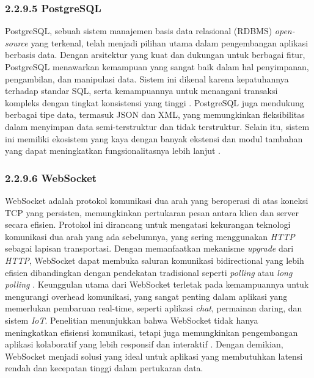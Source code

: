 \subsubsection{2.2.9.5 PostgreSQL}
PostgreSQL, sebuah sistem manajemen basis data relasional (RDBMS) \emph{open-source} yang terkenal, telah menjadi pilihan utama dalam pengembangan aplikasi berbasis data. Dengan arsitektur yang kuat dan dukungan untuk berbagai fitur, PostgreSQL menawarkan kemampuan yang sangat baik dalam hal penyimpanan, pengambilan, dan manipulasi data. Sistem ini dikenal karena kepatuhannya terhadap standar SQL, serta kemampuannya untuk menangani transaksi kompleks dengan tingkat konsistensi yang tinggi \cite{postgresql2023docs}. PostgreSQL juga mendukung berbagai tipe data, termasuk JSON dan XML, yang memungkinkan fleksibilitas dalam menyimpan data semi-terstruktur dan tidak terstruktur. Selain itu, sistem ini memiliki ekosistem yang kaya dengan banyak ekstensi dan modul tambahan yang dapat meningkatkan fungsionalitasnya lebih lanjut \cite{postgresql2023docs}.


\subsubsection{2.2.9.6 WebSocket}
WebSocket adalah protokol komunikasi dua arah yang beroperasi di atas koneksi TCP yang persisten, memungkinkan pertukaran pesan antara klien dan server secara efisien. Protokol ini dirancang untuk mengatasi kekurangan teknologi komunikasi dua arah yang ada sebelumnya, yang sering menggunakan \emph{HTTP} sebagai lapisan transportasi. Dengan memanfaatkan mekanisme \emph{upgrade} dari \emph{HTTP}, WebSocket dapat membuka saluran komunikasi bidirectional yang lebih efisien dibandingkan dengan pendekatan tradisional seperti \emph{polling} atau \emph{long polling} \cite{Fette2011}. Keunggulan utama dari WebSocket terletak pada kemampuannya untuk mengurangi overhead komunikasi, yang sangat penting dalam aplikasi yang memerlukan pembaruan real-time, seperti aplikasi \emph{chat}, permainan daring, dan sistem \emph{IoT}. Penelitian menunjukkan bahwa WebSocket tidak hanya meningkatkan efisiensi komunikasi, tetapi juga memungkinkan pengembangan aplikasi kolaboratif yang lebih responsif dan interaktif \cite{Milsap2019}. Dengan demikian, WebSocket menjadi solusi yang ideal untuk aplikasi yang membutuhkan latensi rendah dan kecepatan tinggi dalam pertukaran data.


